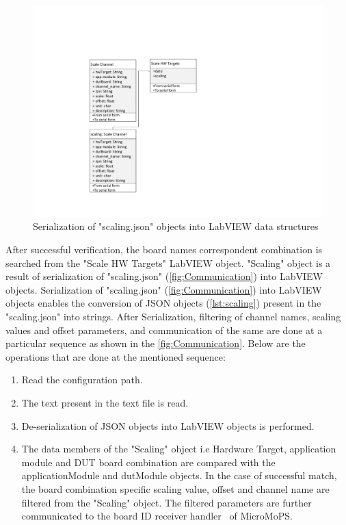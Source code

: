 \begin{figure}[hbt]
		\centering
		\includegraphics[trim=0 55 0 210, clip, width=210mm, scale=0.75]{images/Scaling_channel.pdf}
		\caption{Serialization of "scaling.json" objects into LabVIEW data structures}
		\label{fig:scSerialization}
\end{figure}

After successful verification, the board names correspondent combination is searched from the "Scale HW Targets" LabVIEW object. 
"Scaling" object is a result of serialization of "scaling.json" (\cref{fig:Communication}) into LabVIEW objects.
Serialization of "scaling.json" (\cref{fig:Communication}) into LabVIEW objects enables the conversion of JSON objects (\cref{lst:scaling}) present in the "scaling.json" into strings. 
After Serialization, filtering of channel names, scaling values and offset parameters, and communication of the same are done at a particular sequence as shown in the \cref{fig:Communication}. 
Below are the operations that are done at the mentioned sequence:       

\begin{enumerate}
\item Read the configuration path.
\item The text present in the text file is read.
\item De-serialization of JSON objects into LabVIEW objects is performed.
\item The data members of the "Scaling" object i.e Hardware Target, application module and \acrshort{DUT} board combination are compared with the applicationModule and dutModule objects. 
In the case of successful match, the board combination specific scaling value, offset and channel name are filtered from the "Scaling" object. 
The filtered parameters are further communicated to the board ID receiver handler~\cite{Steinwender2016} of MicroMoPS. 
\end{enumerate}

